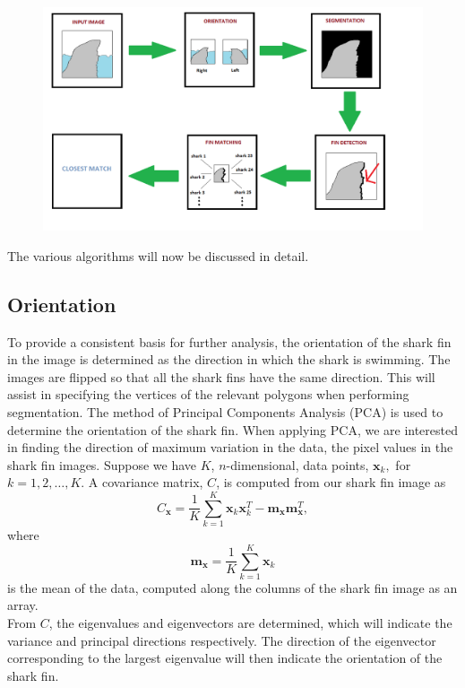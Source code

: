 \documentclass[a4paper,10pt]{article}
\begin{document}
\begin{figure}[H]
 \centering
 \includegraphics[width=5in]{pipeline.png}
\end{figure}

The various algorithms will now be discussed in detail.  

\subsection{Orientation}
\label{orient}
To provide a consistent basis for further analysis, the
orientation of the shark fin in the image is determined as the direction in
which the shark is
swimming.  The images are flipped so that
all the shark fins have the same direction.  This will assist in specifying the vertices of the relevant polygons when performing
segmentation.
The method of Principal Components Analysis (PCA) is used to determine the orientation of the shark fin.  When applying
PCA, we are interested in finding the direction of maximum variation in the
data, the pixel values in the shark fin images.  Suppose we have $K$, $n$-dimensional, data points, $\mathbf{x}_k,$ for
$k=1,2, \ldots ,K$.  A covariance matrix, $C$, is computed from our shark fin image as 
\[
 C_{\mathbf{x}} = \frac{1}{K} \sum_{k=1}^{K} \mathbf{x}_{k}\mathbf{x}_{k}^{T} -
\mathbf{m}_{\mathbf{x}}\mathbf{m}_{\mathbf{x}}^{T} 
,\]
where
\[
 \mathbf{m}_{\mathbf{x}} = \frac{1}{K} \sum_{k=1}^{K}\mathbf{x}_{k}
\]
is the mean of the data, computed along the columns of the shark fin image as an array. \\


From $C$, the eigenvalues and eigenvectors are determined, which will indicate the
variance and principal directions respectively.
The direction of the eigenvector corresponding to the largest eigenvalue will
then indicate the orientation of the shark fin. \\
\end{document}
